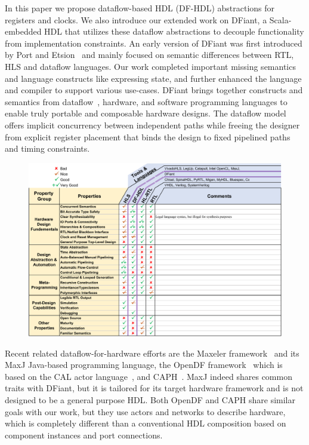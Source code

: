 In this paper we propose dataflow-based HDL (DF-HDL) abstractions for registers and clocks. We also introduce our extended work on DFiant, a Scala-embedded HDL that utilizes these dataflow abstractions to decouple functionality from implementation constraints. An early version of DFiant was first introduced by Port and Etsion~\cite{Port2017} and mainly focused on semantic differences between RTL, HLS and dataflow languages. Our work completed important missing semantics and language constructs like expressing state, and further enhanced the language and compiler to support various use-cases. DFiant brings together constructs and semantics from dataflow~\cite{le1986signal, Thuau1991, gurd1985manchester, arvind1992id}, hardware, and software programming languages to enable truly portable and composable hardware designs. The dataflow model offers implicit concurrency between independent paths while freeing the designer from explicit register placement that binds the design to fixed pipelined paths and timing constraints.

\begin{figure}[t]
	\centering
	\captionsetup{justification=centering}
	\includegraphics[width=\linewidth]{graphics/HDLs-cropped.pdf} 
	\label{fig:motivation}
\end{figure}

Recent related dataflow-for-hardware efforts are the Maxeler framework~\cite{Pell2011} and its MaxJ Java-based programming language, the OpenDF framework~\cite{bhattacharyya2008opendf} which is based on the CAL actor language~\cite{eker2003cal}, and CAPH~\cite{serot2011implementing}. MaxJ indeed shares common traits with DFiant, but it is tailored for its target hardware framework and is not designed to be a general purpose HDL. Both OpenDF and CAPH share similar goals with our work, but they use actors and networks to describe hardware, which is completely different than a conventional HDL composition based on component instances and port connections.

